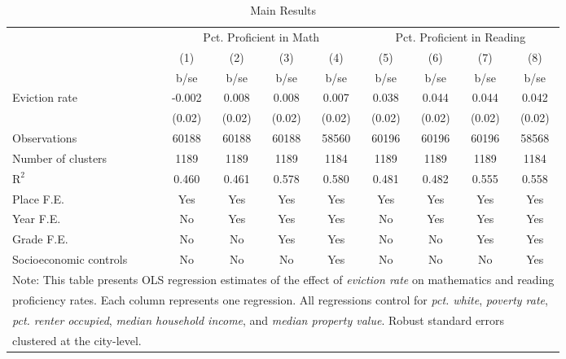 \begin{table}[htbp]\centering
\def\sym#1{\ifmmode^{#1}\else\(^{#1}\)\fi}
\caption{Main Results}
\begin{tabular}{l*{8}{c}}
\toprule
                    &\multicolumn{4}{c}{Pct. Proficient in Math}        &\multicolumn{4}{c}{Pct. Proficient in Reading}     \\\cmidrule(lr){2-5}\cmidrule(lr){6-9}
                    &\multicolumn{1}{c}{(1)}&\multicolumn{1}{c}{(2)}&\multicolumn{1}{c}{(3)}&\multicolumn{1}{c}{(4)}&\multicolumn{1}{c}{(5)}&\multicolumn{1}{c}{(6)}&\multicolumn{1}{c}{(7)}&\multicolumn{1}{c}{(8)}\\
                    &        b/se&        b/se&        b/se&        b/se&        b/se&        b/se&        b/se&        b/se\\
\midrule
Eviction rate       &      -0.002&       0.008&       0.008&       0.007&       0.038&       0.044&       0.044&       0.042\\
                    &      (0.02)&      (0.02)&      (0.02)&      (0.02)&      (0.02)&      (0.02)&      (0.02)&      (0.02)\\
\midrule
Observations        &       60188&       60188&       60188&       58560&       60196&       60196&       60196&       58568\\
Number of clusters  &        1189&        1189&        1189&        1184&        1189&        1189&        1189&        1184\\
$\text{R}^2$        &       0.460&       0.461&       0.578&       0.580&       0.481&       0.482&       0.555&       0.558\\
Place F.E.          &         Yes&         Yes&         Yes&         Yes&         Yes&         Yes&         Yes&         Yes\\
Year F.E.           &          No&         Yes&         Yes&         Yes&          No&         Yes&         Yes&         Yes\\
Grade F.E.          &          No&          No&         Yes&         Yes&          No&          No&         Yes&         Yes\\
Socioeconomic controls&          No&          No&          No&         Yes&          No&          No&          No&         Yes\\
\bottomrule
\multicolumn{9}{l}{\footnotesize Note: This table presents OLS regression estimates of the effect of \emph{eviction rate} on mathematics and reading}\\
\multicolumn{9}{l}{\footnotesize proficiency rates. Each column represents one regression. All regressions control for \emph{pct. white}, \emph{poverty rate},}\\
\multicolumn{9}{l}{\footnotesize \emph{pct. renter occupied}, \emph{median household income}, and \emph{median property value}. Robust standard errors}\\
\multicolumn{9}{l}{\footnotesize clustered at the city-level.}\\
\end{tabular}
\end{table}
